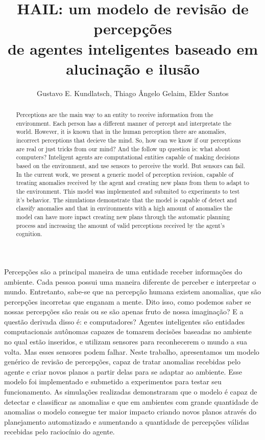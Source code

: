 \documentclass[12pt]{article}
\title{HAIL: um modelo de revisão de percepções\\de agentes inteligentes baseado em alucinação e ilusão}
\author{Gustavo E. Kundlatsch\inst{1}, Thiago Ângelo Gelaim\inst{1}, Elder Santos\inst{1} }
\theoremstyle{definition}
\begin{document}
 

\maketitle

\begin{abstract}
  Perceptions are the main way to an entity to receive information from the environment. Each person has a different manner of percept and interpretate the world. However, it is known that in the human perception there are anomalies, incorrect perceptions that decieve the mind. So, how can we know if our perceptions are real or just tricks from our mind? And the follow up question is: what about computers? Inteligent agents are computational entities capable of making decisions based on the environment, and use sensors to perceive the world. But sensors can fail. In the current work, we present a generic model of perception revision, capable of treating anomalies received by the agent and creating new plans from them to adapt to the environment. This model was implemented and submited to experiments to test it's behavior. The simulations demonstrate that the model is capable of detect and classify anomalies and that in environments with a high amount of anomalies the model can have more inpact creating new plans through the automatic planning process and increasing the amount of valid perceptions received by the agent's cognition.
\end{abstract}
     
\begin{resumo} 
  Percepções são a principal maneira de uma entidade receber informações do ambiente. Cada pessoa possui uma maneira diferente de perceber e interpretar o mundo. Entretanto, sabe-se que na percepção humana existem anomalias, que são percepções incorretas que enganam a mente. Dito isso, como podemos saber se nossas percepções são reais ou se são apenas fruto de nossa imaginação? E a questão derivada disso é: e computadores? Agentes inteligentes são entidades computacionais autônomas capazes de tomarem decisões baseadas no ambiente no qual estão inseridos, e utilizam sensores para reconhecerem o mundo a sua volta. Mas esses sensores podem falhar. Neste trabalho, apresentamos um modelo genérico de revisão de percepções, capaz de tratar anomalias recebidas pelo agente e criar novos planos a partir delas para se adaptar ao ambiente. Esse modelo foi implementado e submetido a experimentos para testar seu funcionamento. As simulações realizadas demonstraram que o modelo é capaz de detectar e classificar as anomalias e que em ambientes com grande quantidade de anomalias o modelo consegue ter maior impacto criando novos planos através do planejamento automatizado e aumentando a quantidade de percepções válidas recebidas pelo raciocínio do agente.
\end{resumo}










\end{document}
